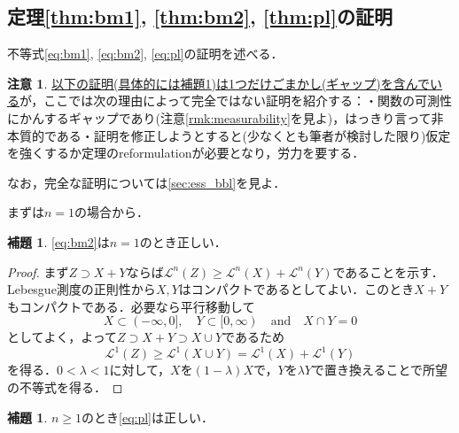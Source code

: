 \documentclass[a4j]{ltjsarticle}
\newcommand{\Lm}{\mathcal{L}}
\newcommand{\1}{\bm{1}}
\numberwithin{equation}{section}
\theoremstyle{definition}
\newtheorem{lem}[thm]{補題}
\newtheorem{rmk}[thm]{注意}
\begin{document}
\subsection{定理\ref{thm:bm1}, \ref{thm:bm2}, \ref{thm:pl}の証明}
不等式\eqref{eq:bm1}, \eqref{eq:bm2}, \eqref{eq:pl}の証明を述べる．
\begin{rmk}\label{rmk:gap}
    \underline{以下の証明(具体的には補題\ref{lem:proof_of_pl})は1つだけごまかし(ギャップ)を含んでいる}が，ここでは次の理由によって完全ではない証明を紹介する：・関数の可測性にかんするギャップであり(注意\ref{rmk:measurability}を見よ)，はっきり言って非本質的である・証明を修正しようとすると(少なくとも筆者が検討した限り)仮定を強くするか定理のreformulationが必要となり，労力を要する．
    
    なお，完全な証明については\ref{sec:ess_bbl}を見よ．
\end{rmk}
まずは$n=1$の場合から．
\begin{lem}\label{lem:bm2_1}
    \eqref{eq:bm2}は$n=1$のとき正しい．
\end{lem}
\begin{proof}
    まず$Z\supset X+Y$ならば$\Lm^n(Z)\geq \Lm^n(X)+\Lm^n(Y)$であることを示す．Lebesgue測度の正則性から$X,Y$はコンパクトであるとしてよい．このとき$X+Y$もコンパクトである．必要なら平行移動して
    \begin{equation}
        X\subset (-\infty,0],\quad Y\subset [0,\infty)\quad \text{and}\quad X\cap Y=\qty{0}
    \end{equation}
    としてよく，よって$Z\supset X+Y\supset X\cup Y$であるため
    \begin{equation}
        \Lm^1(Z)\geq \Lm^1(X\cup Y)=\Lm^1(X)+\Lm^1(Y)
    \end{equation}
    を得る．$0<\lambda<1$に対して，$X$を$(1-\lambda)X$で，$Y$を$\lambda Y$で置き換えることで所望の不等式を得る．
\end{proof}
\begin{lem}\label{lem:proof_of_pl}
    $n\geq1$のとき\eqref{eq:pl}は正しい．
\end{lem}
\end{document}
